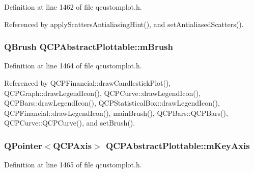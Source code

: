 Definition at line 1462 of file qcustomplot.\+h.



Referenced by apply\+Scatters\+Antialiasing\+Hint(), and set\+Antialiased\+Scatters().

\hypertarget{class_q_c_p_abstract_plottable_a33f00674c0161c13315ab9da0895418e}{}
\subsubsection[{m\+Brush}]{\setlength{\rightskip}{0pt plus 5cm}Q\+Brush Q\+C\+P\+Abstract\+Plottable\+::m\+Brush\hspace{0.3cm}{\ttfamily [protected]}}\label{class_q_c_p_abstract_plottable_a33f00674c0161c13315ab9da0895418e}


Definition at line 1464 of file qcustomplot.\+h.



Referenced by Q\+C\+P\+Financial\+::draw\+Candlestick\+Plot(), Q\+C\+P\+Graph\+::draw\+Legend\+Icon(), Q\+C\+P\+Curve\+::draw\+Legend\+Icon(), Q\+C\+P\+Bars\+::draw\+Legend\+Icon(), Q\+C\+P\+Statistical\+Box\+::draw\+Legend\+Icon(), Q\+C\+P\+Financial\+::draw\+Legend\+Icon(), main\+Brush(), Q\+C\+P\+Bars\+::\+Q\+C\+P\+Bars(), Q\+C\+P\+Curve\+::\+Q\+C\+P\+Curve(), and set\+Brush().

\hypertarget{class_q_c_p_abstract_plottable_a426f42e254d0f8ce5436a868c61a6827}{}
\subsubsection[{m\+Key\+Axis}]{\setlength{\rightskip}{0pt plus 5cm}Q\+Pointer$<${\bf Q\+C\+P\+Axis}$>$ Q\+C\+P\+Abstract\+Plottable\+::m\+Key\+Axis\hspace{0.3cm}{\ttfamily [protected]}}\label{class_q_c_p_abstract_plottable_a426f42e254d0f8ce5436a868c61a6827}


Definition at line 1465 of file qcustomplot.\+h.



